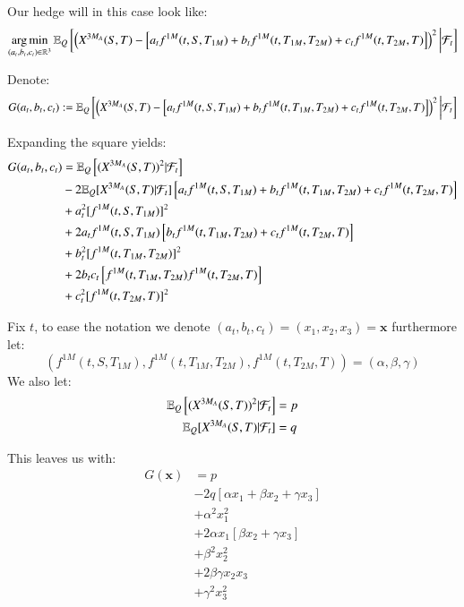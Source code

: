 Our hedge will in this case look like: 
\begin{align*}
\operatorname*{arg\,min}\limits_{(a_{t}, b_{t}, c_{t})\in \mathbb{R}^{3}}\mathbb{E}_{Q}\left[
\left(
X^{3M_{A}}(S,T)- \left[
a_{t}f^{1M}(t,S,T_{1M}) + 
b_{t}f^{1M}(t,T_{1M}, T_{2M}) + 
c_{t}f^{1M}(t,T_{2M}, T)
\right]
\right)^{2}
\bigg{|}\mathcal{F}_{t}
\right]
\end{align*}

Denote: 
\begin{align*}
G(a_{t}, b_{t}, c_{t}) := 
\mathbb{E}_{Q}\left[
\left(
X^{3M_{A}}(S,T)- \left[
a_{t}f^{1M}(t,S,T_{1M}) + 
b_{t}f^{1M}(t,T_{1M}, T_{2M}) + 
c_{t}f^{1M}(t,T_{2M}, T)
\right]
\right)^{2}
\bigg{|}\mathcal{F}_{t}
\right]
\end{align*} 

Expanding the square yields: 
\begin{align*}
G(a_{t}, b_{t}, c_{t}) 
&= 
\mathbb{E}_{Q}\left[(X^{3M_{A}}(S,T))^{2}|\mathcal{F}_{t} \right] \\
&-2\mathbb{E}_{Q}[X^{3M_{A}}(S,T)|\mathcal{F}_{t}]\left[
a_{t}f^{1M}(t,S,T_{1M}) + 
b_{t}f^{1M}(t,T_{1M}, T_{2M}) + 
c_{t}f^{1M}(t,T_{2M}, T)
\right] \\ 
&+ a_{t}^{2}[f^{1M}(t,S,T_{1M})]^{2} \\ 
&+ 2a_{t}f^{1M}(t,S,T_{1M})\left[
b_{t}f^{1M}(t,T_{1M}, T_{2M}) + 
c_{t}f^{1M}(t,T_{2M}, T)
\right] \\ 
&+ b_{t}^{2}[f^{1M}(t,T_{1M}, T_{2M})]^{2} \\ 
&+ 2b_{t}c_{t}\left[
f^{1M}(t,T_{1M}, T_{2M})f^{1M}(t,T_{2M}, T)
\right] \\ 
&+ c_{t}^{2}[f^{1M}(t,T_{2M}, T)]^{2}
\end{align*} 

Fix $t$, to ease the notation we denote $(a_{t}, b_{t}, c_{t}) = (x_{1}, x_{2}, x_{3}) = \mathbf{x}$ furthermore let: 
\[
\left(
f^{1M}(t,S,T_{1M}),f^{1M}(t,T_{1M}, T_{2M}), f^{1M}(t,T_{2M}, T) 
\right)
= \left(
\alpha, \beta, \gamma
\right)
\]
We also let: 
\begin{align*}
\mathbb{E}_{Q}\left[(X^{3M_{A}}(S,T))^{2}|\mathcal{F}_{t} \right] &= p \\ 
\mathbb{E}_{Q}[X^{3M_{A}}(S,T)|\mathcal{F}_{t}] &= q
\end{align*}

This leaves us with: 
\begin{align*}
G(\mathbf{x}) &= 
p \\
&- 2q\left[
\alpha x_{1} + \beta x_{2} + \gamma x_{3}
\right] \\ 
&+ \alpha^{2}x_{1}^{2} \\ 
&+ 2\alpha x_{1}\left[
\beta x_{2} + \gamma x_{3}
\right] \\ 
&+ \beta^{2}x_{2}^{2} \\ 
&+ 2\beta\gamma x_{2}x_{3} \\ 
&+ \gamma^{2}x_{3}^{2}
\end{align*}


